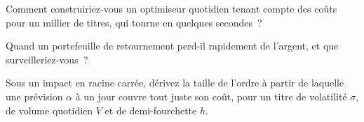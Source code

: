 \begin{interviewq}\label{iq:s1:short-term-reversal:4}
Comment construiriez-vous un optimiseur quotidien tenant compte des coûts pour un millier de titres, qui tourne en quelques secondes~?
\end{interviewq}

\begin{interviewq}\label{iq:s1:short-term-reversal:5}
Quand un portefeuille de retournement perd-il rapidement de l'argent, et que surveilleriez-vous~?
\end{interviewq}

\begin{interviewq}\label{iq:s1:short-term-reversal:6}
Sous un impact en racine carrée, dérivez la taille de l'ordre à partir de laquelle une prévision $\alpha$ à un jour couvre tout juste son coût, pour un titre de volatilité $\sigma$, de volume quotidien
$V$ et de demi-fourchette $h$.
\end{interviewq}
